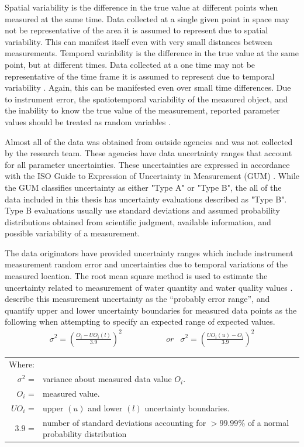 \begin{linenumbers}
Spatial variability is the difference in the true value at different points when measured at the same time.  Data collected at a single given point in space may not be representative of the area it is assumed to represent due to spatial variability.  This can manifest itself even with very small distances between measurements.  Temporal variability is the difference in the true value at the same point, but at different times.  Data collected at a one time may not be representative of the time frame it is assumed to represent due to temporal variability \parencite{Gates1996}.  Again, this can be manifested even over small time differences.  Due to instrument error, the spatiotemporal variability of the measured object, and the inability to know the true value of the measurement, reported parameter values should be treated as random variables \parencite{haan1989,haan2002}.

Almost all of the data was obtained from outside agencies and was not collected by the research team.  These agencies have data uncertainty ranges that account for all parameter uncertainties.  These uncertainties are expressed in accordance with the ISO Guide to Expression of Uncertainty in Measurement (GUM) \parencite{gum2008}.  While the GUM classifies uncertainty as either "Type A" or "Type B", the all of the data included in this thesis has uncertainty evaluations described as "Type B".  Type B evaluations usually use standard deviations and assumed probability distributions obtained from scientific judgment, available information, and possible variability of a measurement.

The data originators have provided uncertainty ranges which include instrument measurement random error and uncertainties due to temporal variations of the measured location.  The root mean square method is used to estimate the uncertainty related to measurement of water quantity and water quality values \parencite{harmel2007, gum2008}.  \textcite{harmel2007} describe this measurement uncertainty as the “probably error range”, and quantify upper and lower uncertainty boundaries for measured data points as the following when attempting to specify an expected range of expected values.
\begin{align}
	\sigma^2 = \left( \frac{O_i-UO_{i}(l)}{3.9} \right)^2  &  \phantom{xxxxxxxx} or  & 	\sigma^2 = \left( \frac{UO_{i}(u)-O_i}{3.9} \right)^2 \label{eq:uncertainty1}
\end{align}
\begin{tabular}{r p{5.5in}}
	Where:\\
	$ \sigma^2 $ = & variance about measured data value $ O_i $.\\
	$ O_i $ = & measured value.\\
	$ UO_i $ = & upper $ (u) $ and lower $ (l) $ uncertainty boundaries.\\
	$ 3.9 $ = & number of standard deviations accounting for $ >99.99 $\% of a normal probability distribution
\end{tabular}\\


\end{linenumbers}
